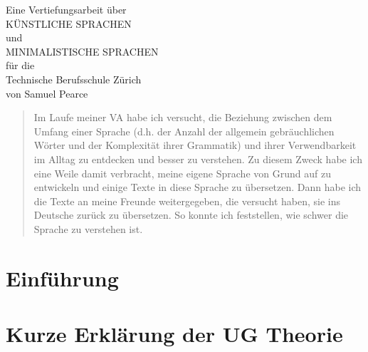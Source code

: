 \documentclass{article}
\begin{document}
%

\begingroup
\centering
\vfill
\Large{Eine Vertiefungsarbeit über}\\
\Huge{KÜNSTLICHE SPRACHEN}\\
\huge{und}\\
\huge{MINIMALISTISCHE SPRACHEN}\\
\large{für die}\\
\Large{Technische Berufsschule Zürich}\\
\vspace{3cm}
\Large{von Samuel Pearce}\\
\vfill\null
\endgroup
\thispagestyle{empty}

\tableofcontents
\pagebreak

%
% 

\begin{abstract}
    Im Laufe meiner VA habe ich versucht, die Beziehung zwischen dem Umfang einer Sprache
    (d.h. der Anzahl der allgemein gebräuchlichen Wörter und der Komplexität ihrer Grammatik)
    und ihrer Verwendbarkeit im Alltag zu entdecken und besser zu verstehen.
    Zu diesem Zweck habe ich eine Weile damit verbracht, meine eigene Sprache von Grund auf zu
    entwickeln und einige Texte in diese Sprache zu übersetzen. Dann habe ich die Texte an meine
    Freunde weitergegeben, die versucht haben, sie ins Deutsche zurück zu übersetzen.
    So konnte ich feststellen, wie schwer die Sprache zu verstehen ist.
\end{abstract}



\section{Einführung}
\cite{Stevens72}



\section{Kurze Erklärung der UG Theorie}
\end{document}

